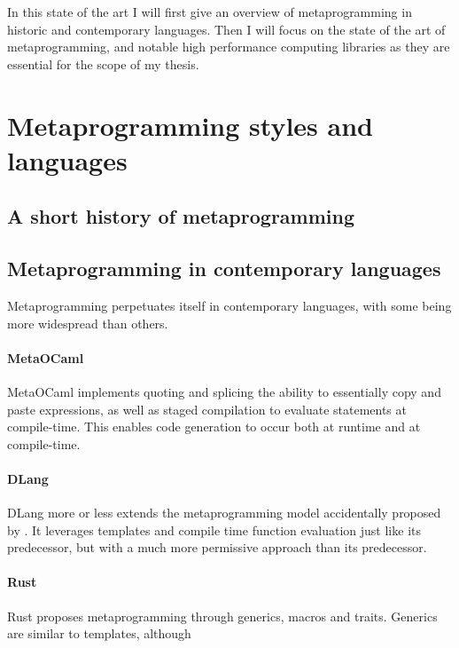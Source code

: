 \documentclass[../main]{subfiles}
\begin{document}

In this state of the art I will first give an overview of metaprogramming in
historic and contemporary languages. Then I will focus on the state of the art
of \cpp metaprogramming, and notable high performance computing libraries as they
are essential for the scope of my thesis.

\section{
  Metaprogramming styles and languages
}

\subsection{A short history of metaprogramming}

\subsection{Metaprogramming in contemporary languages}

Metaprogramming perpetuates itself in contemporary languages,
with some being more widespread than others.

\paragraph{MetaOCaml}

MetaOCaml\cite{metaocaml} implements quoting and splicing
\ie the ability to essentially copy and paste expressions,
as well as staged compilation to evaluate statements at compile-time.
This enables code generation to occur both at runtime and at compile-time.

\paragraph{DLang}

DLang more or less extends the metaprogramming model accidentally proposed
by \cpp. It leverages templates and compile time function evaluation just like
its predecessor, but with a much more permissive approach than its predecessor.


\paragraph{Rust}

Rust proposes metaprogramming through generics, macros and traits.
Generics are similar to \cpp templates, although
\end{document}
